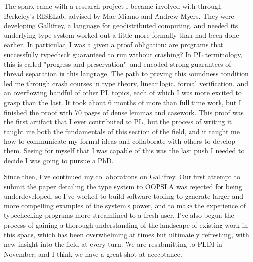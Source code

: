 \documentclass{nsf-grfp}
\begin{document}
The spark came with a research project I became involved with through Berkeley's RISELab, advised by Mae Milano and Andrew Myers. They were developing Gallifrey, a language for geodistributed computing, and needed its underlying type system worked out a little more formally than had been done earlier. In particular, I was a given a proof obligation: are programs that successfully typecheck guaranteed to run without crashing? In PL terminology, this is called "progress and preservation", and encoded strong guarantees of thread separation in this language. The path to proving this soundness condition led me through crash courses in type theory, linear logic, formal verification, and an overflowing handful of other PL topics, each of which I was more excited to grasp than the last. It took about 6 months of more than full time work, but I finished the proof with 70 pages of dense lemmas and casework. This proof was the first artifact that I ever contributed to PL, but the process of writing it taught me both the fundamentals of this section of the field, and it taught me how to communicate my formal ideas and collaborate with others to develop them. Seeing for myself that I was capable of this was the last push I needed to decide I was going to pursue a PhD.

Since then, I've continued my collaborations on Gallifrey. Our first attempt to submit the paper detailing the type system to OOPSLA was rejected for being underdeveloped, so I've worked to build software tooling to generate larger and more compelling examples of the system's power, and to make the experience of typechecking programs more streamlined to a fresh user. I've also begun the process of gaining a thorough understanding of the landscape of existing work in this space, which has been overwhelming at times but ultimately refreshing, with new insight into the field at every turn. We are resubmitting to PLDI in November, and I think we have a great shot at acceptance.
\end{document}
